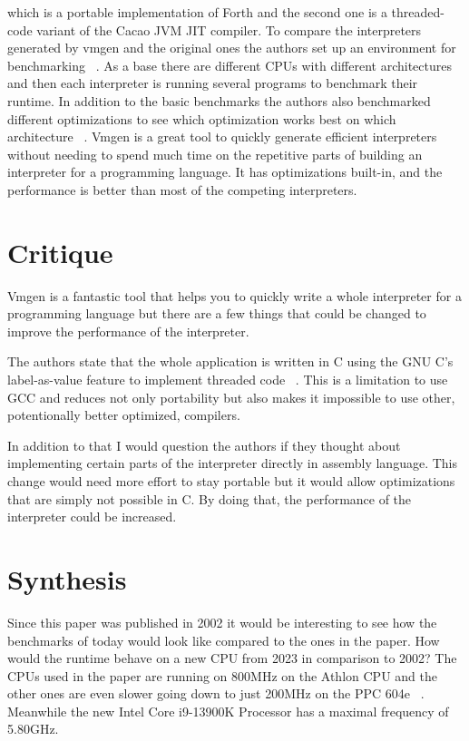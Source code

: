 \documentclass{article}
\begin{document}
which is a portable implementation of Forth and the second one is a
threaded-code variant of the Cacao JVM JIT compiler. To compare the
interpreters generated by vmgen and the original ones the authors set up an
environment for benchmarking ~\cite{vmgen}. As a base there are different CPUs
with different architectures and then each interpreter is running several
programs to benchmark their runtime. In addition to the basic benchmarks the
authors also benchmarked different optimizations to see which optimization
works best on which architecture ~\cite{vmgen}. Vmgen is a great tool to
quickly generate efficient interpreters without needing to spend much time on
the repetitive parts of building an interpreter for a programming language. It
has optimizations built-in, and the performance is better than most of the
competing interpreters. 

\section{Critique}
Vmgen is a fantastic tool that helps you to quickly write a whole interpreter
for a programming language but there are a few things that could be changed
to improve the performance of the interpreter. 

The authors state that the whole application is written in C using the GNU C’s
label-as-value feature to implement threaded code ~\cite{vmgen}. This is a
limitation to use GCC and reduces not only portability but also makes it
impossible to use other, potentionally better optimized, compilers. 

In addition to that I would question the authors if they thought about
implementing certain parts of the interpreter directly in assembly language.
This change would need more effort to stay portable but it would allow
optimizations that are simply not possible in C. By doing that, the performance
of the interpreter could be increased.

\section{Synthesis}
Since this paper was published in 2002 it would be interesting to see how the
benchmarks of today would look like compared to the ones in the paper. How
would the runtime behave on a new CPU from 2023 in comparison to 2002? The
CPUs used in the paper are running on 800MHz on the Athlon CPU and the other
ones are even slower going down to just 200MHz on the PPC 604e ~\cite{vmgen}.
Meanwhile the new Intel Core i9-13900K Processor has a maximal frequency of
5.80GHz.
\end{document}
